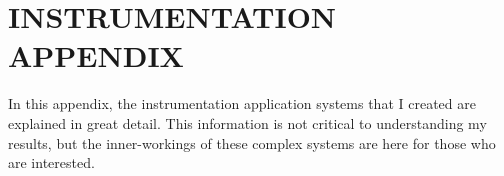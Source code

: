



\appendixtitle
\appendix

\chapter{INSTRUMENTATION APPENDIX}\label{apx:instrumentation}

In this appendix, the instrumentation application systems that I created are explained in great detail. This information is not critical to understanding my results, but the inner-workings of these complex systems are here for those who are interested.



